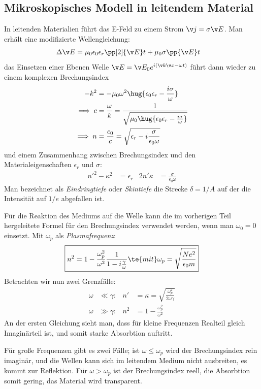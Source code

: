 \documentclass[twocolumn, unnumberedsubsub]{summery_5.0} %
\begin{document}
\subsection{Mikroskopisches Modell in leitendem Material}
In leitenden Materialien führt das E-Feld zu einem Strom $\v j = \sigma \v E$. Man erhält eine modifizierte Wellengleichung:
\begin{align*}
    \Delta \v E &= \mu_0\epsilon_0 \epsilon_r  \pp [2]{\v E}t + \mu_0 \sigma  \pp{\v E}t 
\end{align*}
das Einsetzen einer Ebenen Welle $\v E= \v E_0 e^{i(\v k\v x - \omega t)}$ 
führt dann wieder zu einem komplexen Brechungsindex
\begin{align*}
    -k^2 &= -\mu_0 \omega^2 \hug{\epsilon_0 \epsilon_r  - \frac{i \sigma}{\omega}}\\
    \implies c &= \frac\omega k = \frac{1}{\sqrt{\mu_0\hug{\epsilon_0 \epsilon_r - \frac{i\sigma}\omega}}}\\
    \implies n &= \frac{c_0}c=  \sqrt{\epsilon_r-i \frac{\sigma}{\epsilon_0\omega}}
\end{align*}
und einem Zusammenhang zwischen Brechungsindex und den Materialeigenschaften $\epsilon_r$ und $\sigma$:
\begin{align*}
    n'^2 - \kappa^2 &= \epsilon_r &
    2n'\kappa &=\frac\sigma{\epsilon_0 \omega}
\end{align*}
Man bezeichnet als \emph{Eindringtiefe} oder \emph{Skintiefe} die Strecke $\delta = 1/A $ auf der die Intensität auf $1/e$ abgefallen ist.

Für die Reaktion des Mediums auf die Welle kann die im vorherigen Teil hergeleitete Formel für den Brechungsindex verwendet werden, wenn man $\omega_0=0$ einsetzt. Mit $\omega_p$ als \emph{Plasmafrequenz}:
\begin{align*}
    \boxed{n^2 = 1- \frac{\omega_p^2}{\omega^2} \frac1{1-i\frac\gamma\omega} \te{ mit }\omega_p = \sqrt{\frac{Ne^2}{\epsilon_0 m }} }
\end{align*}
Betrachten wir nun zwei Grenzfälle:
\begin{align*}
    \omega &\ll \gamma: &  n'&=\kappa=\sqrt{\frac{\omega_p^2}{2\omega \gamma}}\\
    \omega &\gg \gamma : & n^2 &= 1- \frac{\omega_p^2}{\omega^2} 
\end{align*}
An der ersten Gleichung sieht man, dass für kleine Frequenzen Realteil gleich Imaginärteil ist, und somit starke Absorbtion auftritt.

Für große Frequenzen gibt es zwei Fälle; ist $\omega\le \omega_p$ wird der Brechungsindex rein imaginär, und die Wellen kann sich im leitendem Medium nicht ausbreiten, es kommt zur Reflektion. Für $\omega>\omega_p$ ist der Brechungsindex reell, die Absorbtion somit gering, das Material wird transparent.
\end{document}
